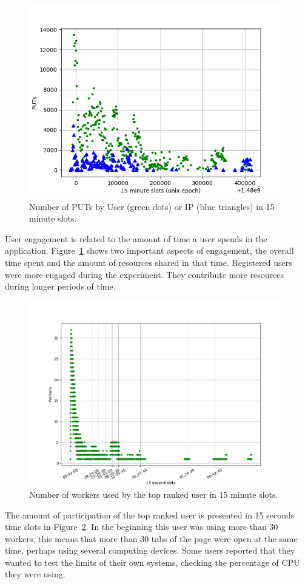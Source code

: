 \documentclass{llncs}
\begin{document}
\begin{figure}[htb]
    \centering
        \includegraphics[width=5.3in]{img/puts_by_time.png}
    \caption{Number of PUTs by User (green dots) or IP (blue triangles) in 15 minute slots.
    }
    \label{fig:puts-time}
\end{figure}
%
User engagement is related to the amount of time a user spends in the
application. Figure~\ref{fig:puts-time} shows two important aspects of
engagement, the overall time spent and the amount of resources shared
in that time. Registered users were more engaged during the experiment.
They contribute more resources during longer periods of time.

\begin{figure}[htb]
    \centering
        \includegraphics[width=5in]{img/workers_best_user.png}
    \caption{ Number of workers used by the top ranked user in 15 minute slots.
    }
    \label{fig:top-user}
\end{figure}
%
The amount of participation of the top ranked user is presented in 15 seconds time slots in
Figure~\ref{fig:top-user}. In the beginning this user was using more than 30
workers, this means that more than 30 tabs of the page were open at the
same time, perhaps using several computing devices. Some users reported that
they wanted to test the limits of their own systems, checking the percentage of
CPU they were using.
\end{document}
